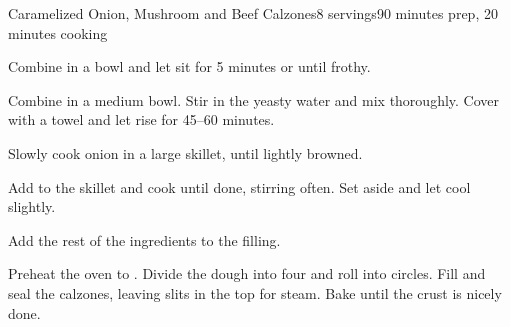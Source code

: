 \documentclass[../Cookbook.tex]{subfiles}
\begin{document}
\begin{recipe}{Caramelized Onion, Mushroom and Beef Calzones}{8 servings}{90 minutes prep, 20 minutes cooking}

Combine in a bowl and let sit for 5 minutes or until frothy.

Combine in a medium bowl. Stir in the yeasty water and mix thoroughly. Cover with a towel and let rise for 45--60 minutes.

Slowly cook onion in a large skillet, until lightly browned.

Add to the skillet and cook until done, stirring often. Set aside and let cool slightly.

Add the rest of the ingredients to the filling.

\newstep
Preheat the oven to .
Divide the dough into four and roll into circles. Fill and seal the calzones, leaving slits in the top for steam. Bake until the crust is nicely done.

\end{recipe}
\end{document}
